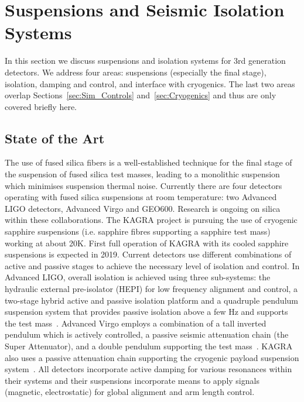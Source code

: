 \chapter{Suspensions and Seismic Isolation Systems}
\label{sec:Suspensions_Isolation}

\begin{samepage} %

In this section we discuss suspensions and isolation systems for 3rd generation detectors. We address four areas: suspensions (especially the final stage), isolation, damping and control, and interface with cryogenics. The last two areas overlap Sections~\ref{sec:Sim_Controls} and~\ref{sec:Cryogenics} and thus are only covered briefly here.

\section{State of the Art}
The use of fused silica fibers is a well-established technique for the final stage of the suspension of fused silica test masses, leading to a monolithic suspension which minimises suspension thermal noise. Currently there are four detectors operating with fused silica suspensions at room temperature: two Advanced LIGO detectors, Advanced Virgo and GEO600. Research is ongoing on silica within these collaborations.
The KAGRA project is pursuing the use of cryogenic sapphire suspensions (i.e. sapphire fibres supporting a sapphire test mass) working at about 20K. First full operation of KAGRA with its cooled sapphire suspensions is expected in 2019.
Current detectors use different combinations of active and passive stages to achieve the necessary level of isolation and control. In Advanced LIGO, overall isolation is achieved using three sub-systems: the hydraulic external pre-isolator (HEPI) for low frequency alignment and control, a two-stage hybrid active and passive isolation platform and a quadruple pendulum suspension system that provides passive isolation above a few Hz and supports the test mass~\cite{Matichard_2015}. Advanced Virgo employs a combination of a tall inverted pendulum which is actively controlled, a passive seismic attenuation chain (the Super Attenuator), and a double pendulum supporting the test mass~\cite{AdvancedVirgo2015}. KAGRA also uses a passive attenuation chain supporting the cryogenic payload suspension system~\cite{KAGRA2013}. All detectors incorporate active damping for various resonances within their systems and their suspensions incorporate means to apply signals (magnetic, electrostatic) for global alignment and arm length control.


\end{samepage}
